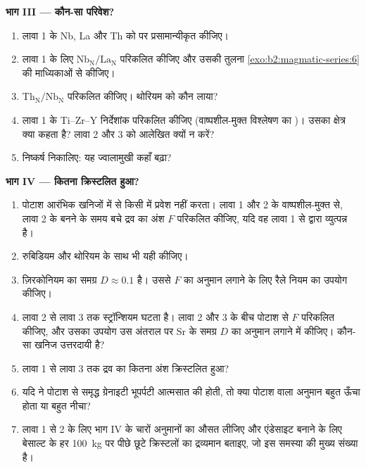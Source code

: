 \begin{problem}[{सप्ताहांत समस्या --- तीन विश्लेषणों से एक ज्वालामुखी के परिवेश तक और
उन क्रिस्टलों तक जो वह पीछे छोड़ गया}]
\noindent\textbf{भाग III --- कौन-सा परिवेश?}
\begin{enumerate}[resume]
\item लावा 1 के Nb, La और Th को  पर प्रसामान्यीकृत कीजिए।
\item लावा 1 के लिए $\mathrm{Nb_N}/\mathrm{La_N}$ परिकलित कीजिए और उसकी तुलना
\cref{exo:b2:magmatic-series:6} की माध्यिकाओं से कीजिए।
\item $\mathrm{Th_N}/\mathrm{Nb_N}$ परिकलित कीजिए। थोरियम को कौन लाया?
\item लावा 1 के Ti--Zr--Y निर्देशांक परिकलित कीजिए (वाष्पशील-मुक्त
विश्लेषण का )। उसका क्षेत्र क्या कहता है? लावा 2 और 3 को आलेखित क्यों न करें?
\item निष्कर्ष निकालिए: यह ज्वालामुखी कहाँ बढ़ा?
\end{enumerate}

\noindent\textbf{भाग IV --- कितना क्रिस्टलित हुआ?}
\begin{enumerate}[resume]
\item पोटाश आरंभिक खनिजों में से किसी में प्रवेश नहीं करता। लावा 1 और 2 के वाष्पशील-मुक्त  से,
लावा 2 के बनने के समय बचे द्रव का अंश $F$ परिकलित कीजिए, यदि वह
लावा 1 से  द्वारा व्युत्पन्न है।
\item रुबिडियम और थोरियम के साथ भी यही कीजिए।
\item ज़िरकोनियम का समग्र $D \approx 0.1$ है। उससे $F$ का अनुमान लगाने के लिए रैले नियम का
उपयोग कीजिए।
\item लावा 2 से लावा 3 तक स्ट्रॉन्शियम घटता है। लावा 2 और 3 के बीच पोटाश से $F$ परिकलित कीजिए,
और उसका उपयोग उस अंतराल पर Sr के समग्र $D$ का अनुमान लगाने में कीजिए। कौन-सा खनिज
उत्तरदायी है?
\item लावा 1 से लावा 3 तक द्रव का कितना अंश क्रिस्टलित हुआ?
\item यदि  ने पोटाश से समृद्ध ग्रेनाइटी भूपर्पटी आत्मसात की होती, तो क्या पोटाश वाला
अनुमान बहुत ऊँचा होता या बहुत नीचा?
\item लावा 1 से 2 के लिए भाग IV के चारों अनुमानों का औसत लीजिए और एंडेसाइट बनाने के लिए
बेसाल्ट के हर \qty{100}{kg} पर पीछे छूटे क्रिस्टलों का द्रव्यमान बताइए, जो इस समस्या की
मुख्य संख्या है।
\end{enumerate}
\end{problem}
